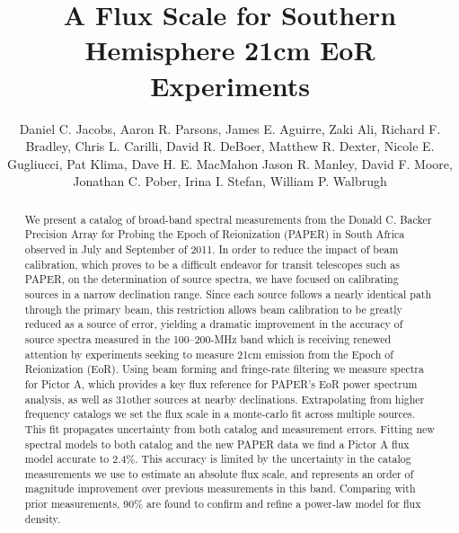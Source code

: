 \documentclass[preprint]{aastex}
\newcommand{\Nconf}{31}
\begin{document}
\title{A Flux Scale for Southern Hemisphere 21cm EoR Experiments}
\author{
Daniel C. Jacobs,
Aaron R. Parsons,
James E. Aguirre,
Zaki Ali,
Richard F. Bradley,
Chris L.  Carilli,
David R. DeBoer,
Matthew R. Dexter,
Nicole E. Gugliucci,
Pat Klima,
Dave H. E. MacMahon
Jason R. Manley,
David F. Moore,
Jonathan C. Pober,
Irina I. Stefan,
William P. Walbrugh}


\begin{abstract}
We present a catalog of broad-band spectral measurements from the 
Donald C. Backer Precision Array for Probing
the Epoch of Reionization (PAPER) in South Africa observed in July and
September of 2011.  In order to reduce the impact of beam calibration, which proves to
be a difficult endeavor for transit telescopes such as PAPER, on the determination
of source spectra, we have focused on calibrating sources in a narrow declination range.
Since each source follows a nearly identical path through the primary beam, this
restriction allows beam calibration to be greatly reduced as a source of error,
yielding a dramatic improvement in the accuracy of source spectra measured in the 
100--200-MHz band which is receiving renewed attention by experiments seeking to
measure 21cm emission from the Epoch of Reionization (EoR). Using beam forming
and fringe-rate filtering we measure spectra for Pictor A, which provides a key flux reference for PAPER's EoR
power spectrum analysis, 
as well as \Nconf other sources at nearby declinations. Extrapolating from higher frequency
catalogs we set the flux scale in a monte-carlo fit across multiple sources. This fit 
propagates uncertainty from both catalog and measurement errors. Fitting new spectral 
models to both catalog and the new PAPER data we find a Pictor A flux model accurate to
2.4\%.
This accuracy is limited by the uncertainty in the catalog measurements we use
to estimate an absolute flux scale, and represents 
an order of magnitude improvement over previous measurements in this band.  
Comparing with prior measurements, 90\% are found to confirm and refine a power-law model for flux density.

\end{abstract}
\end{document}
